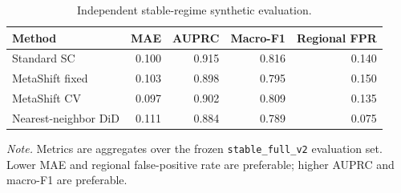 \begin{table}[!ht]
\centering
\caption{Independent stable-regime synthetic evaluation.}
\label{tab:synthetic-metrics}
\small
\begin{tabular}{lrrrr}
\toprule
Method & MAE & AUPRC & Macro-F1 & Regional FPR \\
\midrule
Standard SC & 0.100 & 0.915 & 0.816 & 0.140 \\
MetaShift fixed & 0.103 & 0.898 & 0.795 & 0.150 \\
MetaShift CV & 0.097 & 0.902 & 0.809 & 0.135 \\
Nearest-neighbor DiD & 0.111 & 0.884 & 0.789 & 0.075 \\
\bottomrule
\end{tabular}
\par\smallskip
\begin{minipage}{0.94\linewidth}
\footnotesize\textit{Note.} Metrics are aggregates over the frozen \texttt{stable\_full\_v2} evaluation set. Lower MAE and regional false-positive rate are preferable; higher AUPRC and macro-F1 are preferable.
\end{minipage}
\end{table}
